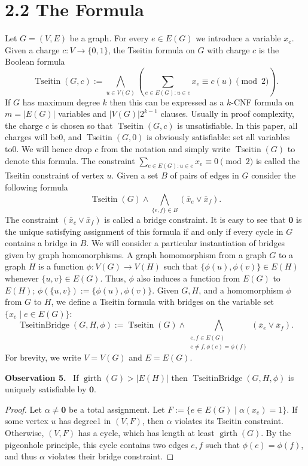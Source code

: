 \documentclass[10pt,a4paper]{article}
\newenvironment{authorclaim}[1]{\par\medskip\noindent\textbf{#1.}\ \ignorespaces}{\par\medskip}
\begin{document}
\section*{2.2 The Formula}
Let $G=(V,E)$ be a graph. For every $e\in E(G)$ we introduce a variable $x_e$. Given a charge $c:V\to\{0,1\}$, the Tseitin formula on $G$ with charge $c$ is the Boolean formula
\begin{equation}
\operatorname{Tseitin}(G,c):=\bigwedge_{u\in V(G)}
\left(\sum_{e\in E(G):u\in e}x_e\equiv c(u)\pmod2\right).\tag{1}
\end{equation}
If $G$ has maximum degree $k$ then this can be expressed as a $k$-CNF formula on $m=|E(G)|$ variables and $|V(G)|2^{k-1}$ clauses. Usually in proof complexity, the charge $c$ is chosen so that $\operatorname{Tseitin}(G,c)$ is unsatisfiable. In this paper, all charges will be0, and $\operatorname{Tseitin}(G,0)$ is obviously satisfiable: set all variables to0. We will hence drop $c$ from the notation and simply write $\operatorname{Tseitin}(G)$ to denote this formula. The constraint $\sum_{e\in E(G):u\in e}x_e\equiv0\pmod2$ is called the Tseitin constraint of vertex $u$. Given a set $B$ of pairs of edges in $G$ consider the following formula
\[
\operatorname{Tseitin}(G)\wedge\bigwedge_{\{e,f\}\in B}(\bar x_e\vee\bar x_f).
\]
The constraint $(\bar x_e\vee\bar x_f)$ is called a bridge constraint. It is easy to see that $\mathbf0$ is the unique satisfying assignment of this formula if and only if every cycle in $G$ contains a bridge in $B$. We will consider a particular instantiation of bridges given by graph homomorphisms. A graph homomorphism from a graph $G$ to a graph $H$ is a function $\phi:V(G)\to V(H)$ such that $\{\phi(u),\phi(v)\}\in E(H)$ whenever $\{u,v\}\in E(G)$. Thus, $\phi$ also induces a function from $E(G)$ to $E(H)$; $\phi(\{u,v\}):=\{\phi(u),\phi(v)\}$. Given $G,H$, and a homomorphism $\phi$ from $G$ to $H$, we define a Tseitin formula with bridges on the variable set $\{x_e\mid e\in E(G)\}$:
\begin{equation}
\operatorname{TseitinBridge}(G,H,\phi):=
\operatorname{Tseitin}(G)\wedge
\bigwedge_{\substack{e,f\in E(G)\\e\ne f,\phi(e)=\phi(f)}}(\bar x_e\vee\bar x_f).\tag{2}
\end{equation}
For brevity, we write $V=V(G)$ and $E=E(G)$.
\begin{authorclaim}{Observation 5}
If $\operatorname{girth}(G)>|E(H)|$ then $\operatorname{TseitinBridge}(G,H,\phi)$ is uniquely satisfiable by $\mathbf0$.
\end{authorclaim}
\begin{proof}
Let $\alpha\ne\mathbf0$ be a total assignment. Let $F:=\{e\in E(G)\mid\alpha(x_e)=1\}$. If some vertex $u$ has degree1 in $(V,F)$, then $\alpha$ violates its Tseitin constraint. Otherwise, $(V,F)$ has a cycle, which has length at least $\operatorname{girth}(G)$. By the pigeonhole principle, this cycle contains two edges $e,f$ such that $\phi(e)=\phi(f)$, and thus $\alpha$ violates their bridge constraint.
\end{proof}
\end{document}
